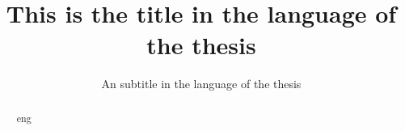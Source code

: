 \documentclass[english, bibtex]{templates/kth/kththesis}
\title{This is the title in the language of the thesis}
\subtitle{An subtitle in the language of the thesis}
\begin{document}
%

\kthcover
\titlepage
\bookinfopage

\frontmatter
\setcounter{page}{1}
\begin{abstract}
  \markboth{\abstractname}{}
\begin{scontents}[store-env=lang]
eng
\end{scontents}
\begin{scontents}[store-env=abstracts,print-env=true]



\end{scontents}





\end{abstract}
\end{document}
